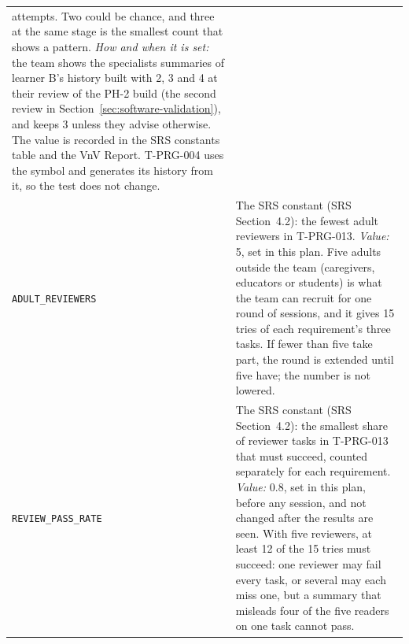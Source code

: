 \documentclass[12pt, titlepage]{article}
\begin{document}
{\begin{longtable}{@{}>{\raggedright\arraybackslash}p{}%
>{\raggedright\arraybackslash}p{}@{}}
attempts. Two could be chance, and three at the same stage is the smallest
count that shows a pattern. \emph{How and when it is set:} the team shows the
specialists summaries of learner B's history built with 2, 3 and 4 at their
review of the PH-2 build (the second review in
Section~\ref{sec:software-validation}), and
keeps 3 unless they advise otherwise. The value is recorded in the SRS
constants table and the VnV Report. T-PRG-004 uses the symbol and generates
its history from it, so the test does not change.\\
\addlinespace
\texttt{ADULT\_REVIEWERS} & The SRS constant (SRS Section~4.2): the
fewest adult reviewers in T-PRG-013. \emph{Value:} 5, set in this plan.
Five adults outside the team (caregivers, educators or students) is what
the team can recruit for one round of sessions, and it gives 15 tries of
each requirement's three tasks. If fewer than five take part, the round
is extended until five have; the number is not lowered.\\
\addlinespace
\texttt{REVIEW\_PASS\_RATE} & The SRS constant (SRS Section~4.2): the
smallest share of reviewer tasks in T-PRG-013 that must succeed, counted
separately for each requirement. \emph{Value:} 0.8, set in this plan, before
any session, and not changed after the results are seen. With five
reviewers, at least 12 of the 15 tries must succeed: one reviewer may fail
every task, or several may each miss one, but a summary that misleads four of
the five readers on one task cannot pass.\\
\bottomrule
\end{longtable}}
\end{document}

